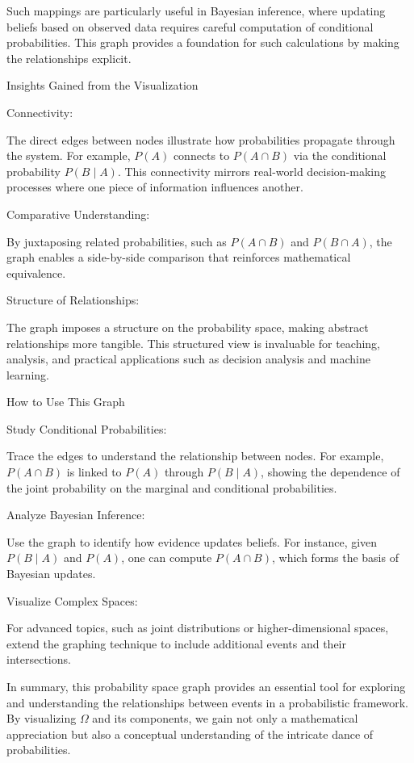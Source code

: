 \documentclass[
  12 pt,
  a4paper,
]{book}
\numberwithin{equation}{section}
\theoremstyle{plain}      %
\theoremstyle{definition} %
\theoremstyle{remark}     %
\theoremstyle{note}         %
\begin{document}
Such mappings are particularly useful in Bayesian inference, where
updating beliefs based on observed data requires careful computation of
conditional probabilities. This graph provides a foundation for such
calculations by making the relationships explicit.

Insights Gained from the Visualization

Connectivity:

The direct edges between nodes illustrate how probabilities propagate
through the system. For example, \(P(A)\) connects to \(P(A \cap B)\)
via the conditional probability \(P(B \mid A)\). This connectivity
mirrors real-world decision-making processes where one piece of
information influences another.

Comparative Understanding:

By juxtaposing related probabilities, such as \(P(A \cap B)\) and
\(P(B \cap A)\), the graph enables a side-by-side comparison that
reinforces mathematical equivalence.

Structure of Relationships:

The graph imposes a structure on the probability space, making abstract
relationships more tangible. This structured view is invaluable for
teaching, analysis, and practical applications such as decision analysis
and machine learning.

How to Use This Graph

Study Conditional Probabilities:

Trace the edges to understand the relationship between nodes. For
example, \(P(A \cap B)\) is linked to \(P(A)\) through \(P(B \mid A)\),
showing the dependence of the joint probability on the marginal and
conditional probabilities.

Analyze Bayesian Inference:

Use the graph to identify how evidence updates beliefs. For instance,
given \(P(B \mid A)\) and \(P(A)\), one can compute \(P(A \cap B)\),
which forms the basis of Bayesian updates.

Visualize Complex Spaces:

For advanced topics, such as joint distributions or higher-dimensional
spaces, extend the graphing technique to include additional events and
their intersections.

In summary, this probability space graph provides an essential tool for
exploring and understanding the relationships between events in a
probabilistic framework. By visualizing \(\Omega\) and its components,
we gain not only a mathematical appreciation but also a conceptual
understanding of the intricate dance of probabilities.
\end{document}
